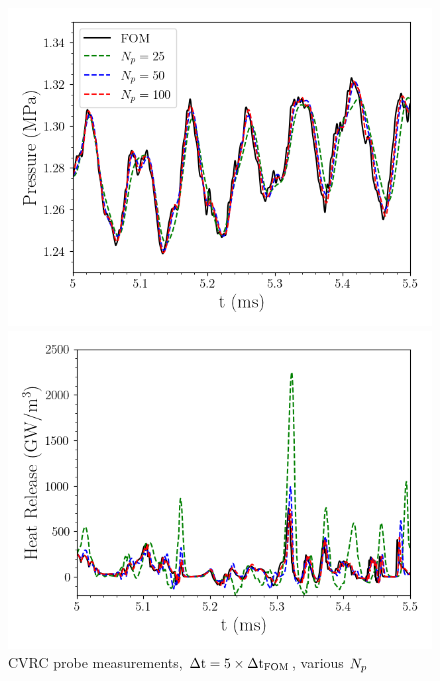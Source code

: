 \begin{figure}
	\begin{minipage}{0.49\linewidth}
		\includegraphics[width=0.99\linewidth]{Chapters/HPROMResults/Images/cvrc/unsampled/pressure_probe_unsampled_modes.png}
	\end{minipage}
	\begin{minipage}{0.49\linewidth}
		\includegraphics[width=0.99\linewidth]{Chapters/HPROMResults/Images/cvrc/unsampled/heat_probe_unsampled_modes.png}
	\end{minipage}
	\caption{\label{fig:cvrcUnsampledROMProbes}CVRC probe measurements, $\Delta \text{t} = 5 \times \Delta \text{t}_{\text{FOM}}$, various $N_p$}
\end{figure}

